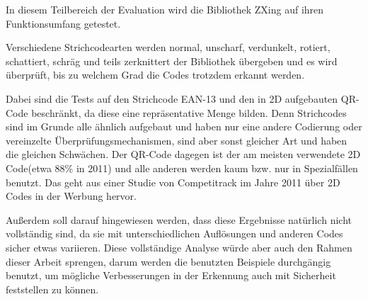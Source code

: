 \writtenby{\dcauthornameriren}%
In diesem Teilbereich der Evaluation wird die Bibliothek ZXing auf ihren Funktionsumfang getestet.

Verschiedene Strichcodearten werden normal, unscharf, verdunkelt, rotiert, schattiert, schräg und teils zerknittert der Bibliothek übergeben und es wird überprüft, bis zu welchem Grad die Codes trotzdem erkannt werden.

Dabei sind die Tests auf den Strichcode EAN-13 und den in 2D aufgebauten QR-Code beschränkt, da diese eine repräsentative Menge bilden. Denn Strichcodes sind im Grunde alle ähnlich aufgebaut und haben nur eine andere Codierung oder vereinzelte Überprüfungsmechanismen, sind aber sonst gleicher Art und haben die gleichen Schwächen. Der QR-Code dagegen ist der am meisten verwendete 2D Code(etwa 88\% in 2011) und alle anderen werden kaum bzw. nur in Spezialfällen benutzt. Das geht aus einer Studie von Competitrack im Jahre 2011 über 2D Codes in der Werbung hervor.

Außerdem soll darauf hingewiesen werden, dass diese Ergebnisse natürlich nicht vollständig sind, da sie mit unterschiedlichen Auflösungen und anderen Codes sicher etwas variieren. Diese vollständige Analyse würde aber auch den Rahmen dieser Arbeit sprengen, darum werden die benutzten Beispiele durchgängig benutzt, um mögliche Verbesserungen in der Erkennung auch mit Sicherheit feststellen zu können.
